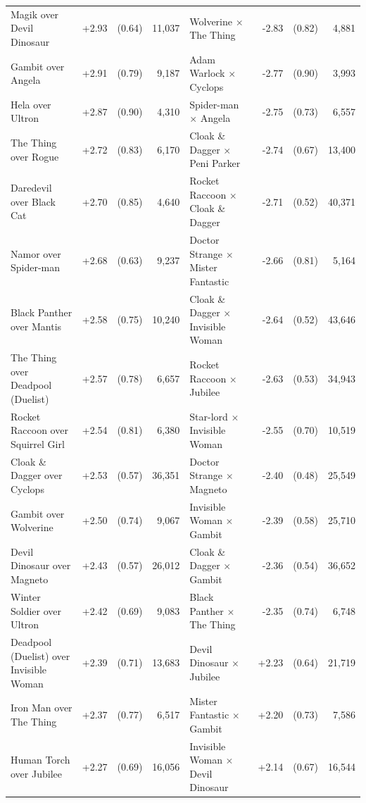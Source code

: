 \documentclass[11pt]{article}
\newcommand{\sym}[1]{\rlap{$^{#1}$}}
\begin{document}
\begin{landscape}
\begin{center}
{\begin{tabular}{l r r r @{\hspace{2.5em}} l r r r}
Magik over Devil Dinosaur & +2.93\sym{***} & (0.64) & 11,037 & Wolverine $\times$ The Thing & -2.83\sym{**} & (0.82) & 4,881 \\
Gambit over Angela & +2.91\sym{***} & (0.79) & 9,187 & Adam Warlock $\times$ Cyclops & -2.77\sym{**} & (0.90) & 3,993 \\
Hela over Ultron & +2.87\sym{**} & (0.90) & 4,310 & Spider-man $\times$ Angela & -2.75\sym{***} & (0.73) & 6,557 \\
The Thing over Rogue & +2.72\sym{**} & (0.83) & 6,170 & Cloak \& Dagger $\times$ Peni Parker & -2.74\sym{***} & (0.67) & 13,400 \\
Daredevil over Black Cat & +2.70\sym{**} & (0.85) & 4,640 & Rocket Raccoon $\times$ Cloak \& Dagger & -2.71\sym{***} & (0.52) & 40,371 \\
Namor over Spider-man & +2.68\sym{***} & (0.63) & 9,237 & Doctor Strange $\times$ Mister Fantastic & -2.66\sym{**} & (0.81) & 5,164 \\
Black Panther over Mantis & +2.58\sym{**} & (0.75) & 10,240 & Cloak \& Dagger $\times$ Invisible Woman & -2.64\sym{***} & (0.52) & 43,646 \\
The Thing over Deadpool (Duelist) & +2.57\sym{**} & (0.78) & 6,657 & Rocket Raccoon $\times$ Jubilee & -2.63\sym{***} & (0.53) & 34,943 \\
Rocket Raccoon over Squirrel Girl & +2.54\sym{**} & (0.81) & 6,380 & Star-lord $\times$ Invisible Woman & -2.55\sym{**} & (0.70) & 10,519 \\
Cloak \& Dagger over Cyclops & +2.53\sym{***} & (0.57) & 36,351 & Doctor Strange $\times$ Magneto & -2.40\sym{***} & (0.48) & 25,549 \\
Gambit over Wolverine & +2.50\sym{**} & (0.74) & 9,067 & Invisible Woman $\times$ Gambit & -2.39\sym{***} & (0.58) & 25,710 \\
Devil Dinosaur over Magneto & +2.43\sym{***} & (0.57) & 26,012 & Cloak \& Dagger $\times$ Gambit & -2.36\sym{***} & (0.54) & 36,652 \\
Winter Soldier over Ultron & +2.42\sym{**} & (0.69) & 9,083 & Black Panther $\times$ The Thing & -2.35\sym{**} & (0.74) & 6,748 \\
Deadpool (Duelist) over Invisible Woman & +2.39\sym{**} & (0.71) & 13,683 & Devil Dinosaur $\times$ Jubilee & +2.23\sym{**} & (0.64) & 21,719 \\
Iron Man over The Thing & +2.37\sym{**} & (0.77) & 6,517 & Mister Fantastic $\times$ Gambit & +2.20\sym{**} & (0.73) & 7,586 \\
Human Torch over Jubilee & +2.27\sym{**} & (0.69) & 16,056 & Invisible Woman $\times$ Devil Dinosaur & +2.14\sym{**} & (0.67) & 16,544 \\

\end{tabular}}
\end{center}
\end{landscape}
\end{document}
